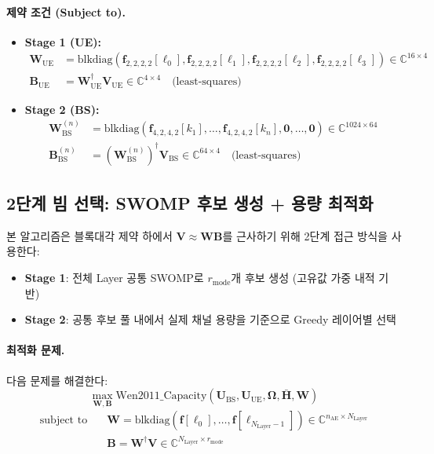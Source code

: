 \documentclass[10pt]{article}
\begin{document}
\paragraph{제약 조건 (Subject to).}
\begin{itemize}
    \item \textbf{Stage 1 (UE):}
    \begin{align}
    \mathbf{W}_{\text{UE}} &= \text{blkdiag}(\mathbf{f}_{2,2,2,2}[\ell_0], \mathbf{f}_{2,2,2,2}[\ell_1], \mathbf{f}_{2,2,2,2}[\ell_2], \mathbf{f}_{2,2,2,2}[\ell_3]) \in \mathbb{C}^{16 \times 4} \\
    \mathbf{B}_{\text{UE}} &= \mathbf{W}_{\text{UE}}^{\dagger} \mathbf{V}_{\text{UE}} \in \mathbb{C}^{4 \times 4} \quad \text{(least-squares)}
    \end{align}
    
    \item \textbf{Stage 2 (BS):}
    \begin{align}
    \mathbf{W}_{\text{BS}}^{(n)} &= \text{blkdiag}(\mathbf{f}_{4,2,4,2}[k_1], \ldots, \mathbf{f}_{4,2,4,2}[k_n], \mathbf{0}, \ldots, \mathbf{0}) \in \mathbb{C}^{1024 \times 64} \\
    \mathbf{B}_{\text{BS}}^{(n)} &= (\mathbf{W}_{\text{BS}}^{(n)})^{\dagger} \mathbf{V}_{\text{BS}} \in \mathbb{C}^{64 \times 4} \quad \text{(least-squares)}
    \end{align}
\end{itemize}

\subsection{2단계 빔 선택: SWOMP 후보 생성 + 용량 최적화}

본 알고리즘은 블록대각 제약 하에서 $\mathbf{V} \approx \mathbf{W}\mathbf{B}$를 근사하기 위해 2단계 접근 방식을 사용한다:
\begin{itemize}
    \item \textbf{Stage 1}: 전체 Layer 공통 SWOMP로 $r_{\text{mode}}$개 후보 생성 (고유값 가중 내적 기반)
    \item \textbf{Stage 2}: 공통 후보 풀 내에서 실제 채널 용량을 기준으로 Greedy 레이어별 선택
\end{itemize}

\paragraph{최적화 문제.}
다음 문제를 해결한다:
\begin{equation}
\max_{\mathbf{W}, \mathbf{B}} \text{Wen2011\_Capacity}(\mathbf{U}_{\text{BS}}, \mathbf{U}_{\text{UE}}, \boldsymbol{\Omega}, \bar{\mathbf{H}}, \mathbf{W})
\end{equation}
\begin{align}
\text{subject to} \quad & \mathbf{W} = \text{blkdiag}(\mathbf{f}[\ell_0], \ldots, \mathbf{f}[\ell_{N_{\text{Layer}}-1}]) \in \mathbb{C}^{n_{\text{AE}} \times N_{\text{Layer}}} \\
& \mathbf{B} = \mathbf{W}^{\dagger} \mathbf{V} \in \mathbb{C}^{N_{\text{Layer}} \times r_{\text{mode}}}
\end{align}
\end{document}
